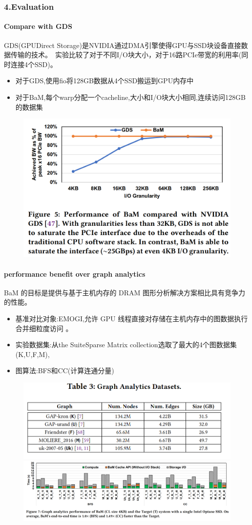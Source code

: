 \documentclass[10pt]{ctexbeamer}
\begin{document}
\begin{frame}
  \frametitle{4.Evaluation}
  \framesubtitle{Compare with GDS}
  GDS(GPUDirect Storage)是NVIDIA通过DMA引擎使得GPU与SSD块设备直接数据传输的技术。\
  实验比较了对于不同I/O块大小，对于16路PCIe带宽的利用率(同时连接4个SSD)。
  \begin{itemize}
    \item 对于GDS,使用fio将128GB数据从4个SSD搬运到GPU内存中
    \item 对于BaM,每个warp分配一个cacheline,大小和I/O块大小相同,连续访问128GB的数据集
  \end{itemize}
  \begin{figure}
    \includegraphics[width=.4\textwidth,height=.4\textheight]{images/gds.png}
  \end{figure}

\end{frame}

\begin{frame}
  \framesubtitle{performance benefit over graph analytics}
  BaM 的目标是提供与基于主机内存的 DRAM 图形分析解决方案相比具有竞争力的性能。
  \begin{itemize}
    \item 基准对比对象:EMOGI,允许 GPU 线程直接对存储在主机内存中的图数据执行合并细粒度访问 \cite{min2020emogi}。
    \item 实验数据集:从the SuiteSparse Matrix collection选取了最大的4个图数据集(K,U,F,M),
    \item 图算法:BFS和CC(计算连通分量)
  \end{itemize}
  \begin{figure}
    \includegraphics[width=.3\textwidth,height=.2\textheight]{images/dataset.png}
    \includegraphics[width=.65\textwidth,height=.3\textheight]{images/graph_analysics.png}
  \end{figure}

\end{frame}
\end{document}
